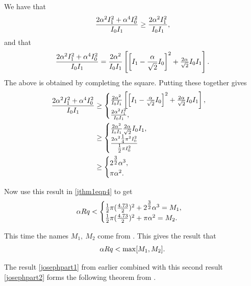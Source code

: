 We have that 
\begin{equation}
    \frac{2 \alpha^2 I^2_{1} + \alpha^4 I^2_{0}}{I_0 I_1} \geq \frac{2 \alpha^2 I^2_{1}}{I_0 I_1},
\end{equation}
and that 
\begin{equation}
    \frac{2 \alpha^2 I^2_{1} + \alpha^4 I^2_{0}}{I_0 I_1} = \frac{2 \alpha^2}{I_0 I_1} \left[\left[I_1 - \frac{\alpha}{\sqrt{2}} I_0\right]^2 + \tfrac{2 \alpha}{\sqrt{2}} I_0 I_1\right].
    \label{jthm1eqn4}
\end{equation}
The above is obtained by completing the square. Putting these together gives
\begin{align}
    \frac{2 \alpha^2 I^2_{1} + \alpha^4 I^2_{0}}{I_0 I_1} &\geq
    \begin{cases}
        \frac{2 \alpha^2}{I_0 I_1} \left[\left[I_1 - \frac{\alpha}{\sqrt{2}} I_0\right]^2 + \tfrac{2 \alpha}{\sqrt{2}} I_0 I_1\right], \\
        \frac{2 \alpha^2 I^2_{1}}{I_0 I_1},
    \end{cases} \nonumber\\
    &\geq \begin{cases}
        \frac{2 \alpha^2}{I_0 I_1} \frac{2 \alpha}{\sqrt{2}} I_0 I_1, \\
        \frac{2 \alpha^2 \tfrac{1}{4} \pi^2 I^2_{0}}{\tfrac{1}{2} \pi I^2_{0}}
    \end{cases} \nonumber\\
    &\geq \begin{cases}
        2^{\tfrac{3}{2}} \alpha^3, \\
        \pi \alpha^2.
    \end{cases}
\end{align}

Now use this result in \eqref{jthm1eqn4} to get 
\begin{equation}
    \alpha R q < \begin{cases}
        \tfrac{1}{2} \pi (\frac{4.73}{2})^2 + 2^{\tfrac{3}{2}} \alpha^3 = M_1, \\
        \tfrac{1}{2} \pi (\frac{4.73}{2})^2 + \pi \alpha^2 = M_2.
    \end{cases}
\end{equation}

This time the names $ M_1,\ M_2 $ come from \citet{joseph1968eigenvalue}. This gives the result that 
\begin{equation}
    \alpha R q < \max[M_1, M_2]. \label{josephpart2}
\end{equation}

The result \eqref{josephpart1} from earlier combined with this second result \eqref{josephpart2} forms the following theorem from \cite{joseph1968eigenvalue}.

